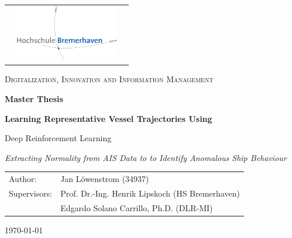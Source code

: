 \begin{titlepage}
\begin{tabular}{lcr}
  \hspace{10cm} &
  \includegraphics[width=170px]{images/hb_logo_2c.jpg}
  \vspace{1cm}
\end{tabular}
	\centering	
	\vspace{0cm}
	{\scshape\Large Digitalization, Innovation and Information Management \par}
	\vspace{1.5cm}
	{\Large\bfseries Master Thesis\par}
	\centering
    \vspace{2cm}
    {\Large\bfseries 
      Learning Representative Vessel Trajectories       Using  \par Deep Reinforcement Learning   \par
}
       {\normalsize\itshape
  Extracting Normality from AIS Data to to Identify Anomalous Ship Behaviour
      \par}
	\vfill
	\begin{tabularx}{\textwidth}{lX}
		Author: & Jan Löwenstrom (34937)\\
		Supervisors: & Prof. Dr.-Ing. Henrik Lipskoch (HS Bremerhaven) \\
		& Edgardo Solano Carrillo, Ph.D. (DLR-MI)
		        
	\end{tabularx}  
    \vfill

	{\large \today \par}       
\end{titlepage}
\restoregeometry